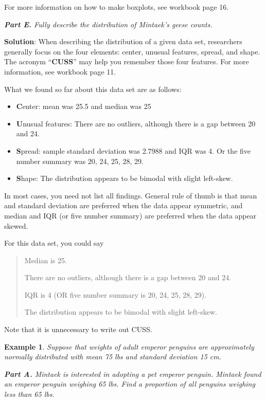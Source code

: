 \documentclass[12pt]{article}
\newcounter{lecnum}
\newtheorem{example}{Example}[lecnum]
\begin{document}
For more information on how to make boxplots, see workbook page 16.

\textit{\textbf{Part E.} Fully describe the distribution of Mintaek's geese counts.}

\textbf{Solution}: When describing the distribution of a given data set, researchers generally focus on the four elements: center, unusual features, spread, and shape. The acronym ``\textbf{CUSS}'' may help you remember those four features. For more information, see workbook page 11.

What we found so far about this data set are as follows:
\begin{itemize}
	\item \textbf{C}enter: mean was 25.5 and median was 25
	\item \textbf{U}nusual features: There are no outliers, although there is a gap between 20 and 24.
	\item \textbf{S}pread: sample standard deviation was 2.7988 and IQR was 4. Or the five number summary was 20, 24, 25, 28, 29.
	\item \textbf{S}hape: The distribution appears to be bimodal with slight left-skew.
\end{itemize}

In most cases, you need not list all findings. General rule of thumb is that mean and standard deviation are preferred when the data appear symmetric, and median and IQR (or five number summary) are preferred when the data appear skewed.

For this data set, you could say
\begin{quote}
	Median is 25. 
	
	There are no outliers, although there is a gap between 20 and 24. 
	
	IQR is 4 (OR five number summary is  20, 24, 25, 28, 29). 
	
	The distribution appears to be bimodal with slight left-skew.
\end{quote}
Note that it is unnecessary to write out CUSS.

\pagebreak

\begin{example}
	Suppose that weights of adult emperor penguins are approximately normally distributed with mean 75 lbs and standard deviation 15 cm.	
\end{example}

\textit{\textbf{Part A.} Mintaek is interested in adopting a pet emperor penguin. Mintaek found an emperor penguin weighing 65 lbs. Find a proportion of all penguins weighing less than 65 lbs.}
\end{document}
